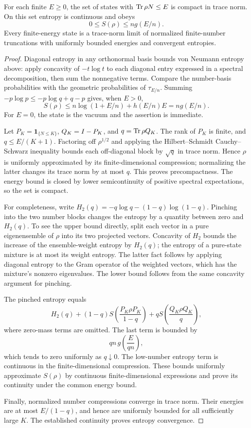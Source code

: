 \begin{lemma}\label{lem:energy-compactness}
For each finite \(E\ge0\), the set of states with \(\operatorname{Tr}\rho N\le E\) is compact in trace norm. On this set entropy is continuous and obeys
\begin{equation}\label{eq:entropy-energy}
 0\le S(\rho)\le n g(E/n).
\end{equation}
Every finite-energy state is a trace-norm limit of normalized finite-number truncations with uniformly bounded energies and convergent entropies.
\end{lemma}
\begin{proof}
Diagonal entropy in any orthonormal basis bounds von Neumann entropy above: apply concavity of \(-t\log t\) to each diagonal entry expressed in a spectral decomposition, then sum the nonnegative terms. Compare the number-basis probabilities with the geometric probabilities of \(\tau_{E/n}\). Summing
\(-p\log p\le-p\log q+q-p\) gives, when \(E>0\),
\[
 S(\rho)\le n\log(1+E/n)+h(E/n)E=ng(E/n).
\]
For \(E=0\), the state is the vacuum and the assertion is immediate.

Let \(P_K=\mathbf1_{\{N\le K\}}\), \(Q_K=I-P_K\), and \(q=\operatorname{Tr}\rho Q_K\). The rank of \(P_K\) is finite, and \(q\le E/(K+1)\). Factoring off \(\rho^{1/2}\) and applying the Hilbert--Schmidt Cauchy--Schwarz inequality bounds each off-diagonal block by \(\sqrt q\) in trace norm. Hence \(\rho\) is uniformly approximated by its finite-dimensional compression; normalizing the latter changes its trace norm by at most \(q\). This proves precompactness. The energy bound is closed by lower semicontinuity of positive spectral expectations, so the set is compact.

For completeness, write \(H_2(q)=-q\log q-(1-q)\log(1-q)\). Pinching into the two number blocks changes the entropy by a quantity between zero and \(H_2(q)\). To see the upper bound directly, split each vector in a pure eigenensemble of \(\rho\) into its two projected vectors. Concavity of \(H_2\) bounds the increase of the ensemble-weight entropy by \(H_2(q)\); the entropy of a pure-state mixture is at most its weight entropy. The latter fact follows by applying diagonal entropy to the Gram operator of the weighted vectors, which has the mixture's nonzero eigenvalues. The lower bound follows from the same concavity argument for pinching.

The pinched entropy equals
\[
 H_2(q)+(1-q)S\!\left(\frac{P_K\rho P_K}{1-q}\right)
       +qS\!\left(\frac{Q_K\rho Q_K}{q}\right),
\]
where zero-mass terms are omitted. The last term is bounded by
\[
 qn\,g\!\left(\frac{E}{qn}\right),
\]
which tends to zero uniformly as \(q\downarrow0\). The low-number entropy term is continuous in the finite-dimensional compression. These bounds uniformly approximate \(S(\rho)\) by continuous finite-dimensional expressions and prove its continuity under the common energy bound.

Finally, normalized number compressions converge in trace norm. Their energies are at most \(E/(1-q)\), and hence are uniformly bounded for all sufficiently large \(K\). The established continuity proves entropy convergence.
\end{proof}

